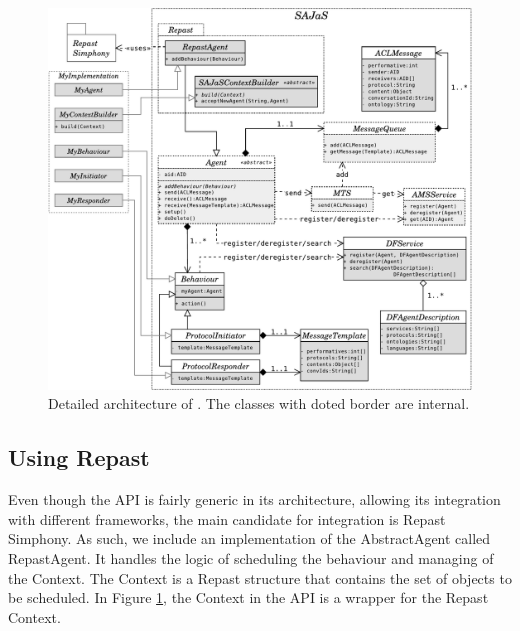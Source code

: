 \begin{figure}[h]
	\centering
	\includegraphics[width=\linewidth]{figures/repacl_arch.pdf}
	\caption{Detailed architecture of \apiname{}. The classes with doted border are internal.}
	\label{fig:arch}
\end{figure}

\subsection{Using Repast}

Even though the API is fairly generic in its architecture, allowing its integration with different frameworks, the main candidate for integration is Repast Simphony. As such, we include an implementation of the AbstractAgent called RepastAgent. It handles the logic of scheduling the behaviour and managing of the Context. The Context is a Repast structure that contains the set of objects to be scheduled. In Figure \ref{fig:arch}, the Context in the API is a wrapper for the Repast Context.


